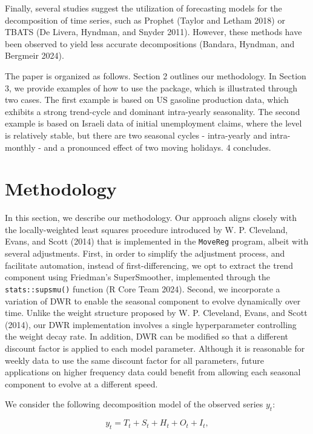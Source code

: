 Finally, several studies suggest the utilization of forecasting models for the decomposition of time series, such as Prophet (Taylor and Letham 2018) or TBATS (De Livera, Hyndman, and Snyder 2011). However, these methods have been observed to yield less accurate decompositions (Bandara, Hyndman, and Bergmeir 2024).

The paper is organized as follows. Section 2 outlines our methodology. In Section 3, we provide examples of how to use the  package, which is illustrated through two cases. The first example is based on US gasoline production data, which exhibits a strong trend-cycle and dominant intra-yearly seasonality. The second example is based on Israeli data of initial unemployment claims, where the level is relatively stable, but there are two seasonal cycles - intra-yearly and intra-monthly - and a pronounced effect of two moving holidays. 4 concludes.

\hypertarget{methodology}{%
\section{Methodology}\label{methodology}}

In this section, we describe our methodology. Our approach aligns closely with the locally-weighted least squares procedure introduced by W. P. Cleveland, Evans, and Scott (2014) that is implemented in the \texttt{MoveReg} program, albeit with several adjustments. First, in order to simplify the adjustment process, and facilitate automation, instead of first-differencing, we opt to extract the trend component using Friedman's SuperSmoother, implemented through the \texttt{stats::supsmu()} function (R Core Team 2024). Second, we incorporate a variation of DWR to enable the seasonal component to evolve dynamically over time. Unlike the weight structure proposed by W. P. Cleveland, Evans, and Scott (2014), our DWR implementation involves a single hyperparameter controlling the weight decay rate. In addition, DWR can be modified so that a different discount factor is applied to each model parameter. Although it is reasonable for weekly data to use the same discount factor for all parameters, future applications on higher frequency data could benefit from allowing each seasonal component to evolve at a different speed.

We consider the following decomposition model of the observed series \(y_{t}\):

\begin{equation}
    y_{t}=T_{t}+S_{t}+H_{t}+O_{t}+I_{t},
     \label{eq:eq1}
\end{equation}

